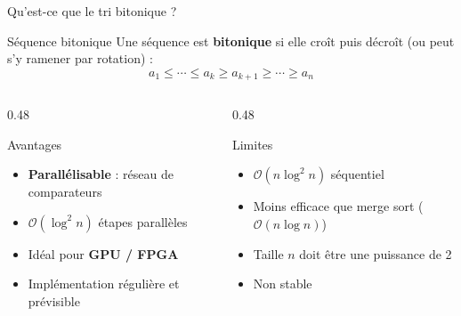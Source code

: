 \documentclass[aspectratio=169,12pt]{beamer}
\newcommand{\Oh}[1]{\mathcal{O}\!\left(#1\right)}
\begin{document}
\begin{frame}{\faSortAmountDown\quad Qu'est-ce que le tri bitonique ?}
  \begin{block}{Séquence bitonique}
    Une séquence est \textbf{bitonique} si elle croît puis décroît
    (ou peut s'y ramener par rotation) :
    $$a_1 \leq \cdots \leq a_k \geq a_{k+1} \geq \cdots \geq a_n$$
  \end{block}

  \vspace{0.5em}
  \begin{columns}[T]
    \begin{column}{0.48\textwidth}
      \begin{exampleblock}{\faCheckCircle\quad Avantages}
        \begin{itemize}
          \item \textbf{Parallélisable} : réseau de comparateurs
          \item $\Oh{\log^2 n}$ étapes parallèles
          \item Idéal pour \textbf{GPU / FPGA}
          \item Implémentation régulière et prévisible
        \end{itemize}
      \end{exampleblock}
    \end{column}
    \begin{column}{0.48\textwidth}
      \begin{alertblock}{\faExclamationTriangle\quad Limites}
        \begin{itemize}
          \item $\Oh{n\log^2 n}$ séquentiel
          \item Moins efficace que merge sort ($\Oh{n\log n}$)
          \item Taille $n$ doit être une puissance de 2
          \item Non stable
        \end{itemize}
      \end{alertblock}
    \end{column}
  \end{columns}
\end{frame}
\end{document}
